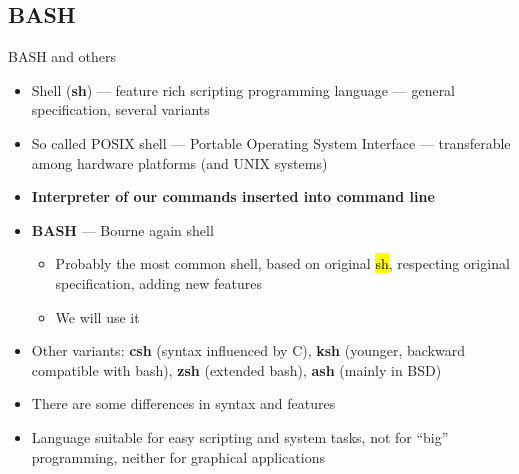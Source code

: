 \documentclass[compress, ucs, xelatex, 11pt, xcolor=svgnames, aspectratio=169,
	hyperref={
		bookmarks=true,
		unicode=true,
		colorlinks=true,
		pdftitle={Linux, command line and MetaCentrum},
		plainpages=false,
		pdfauthor={Vojtech Zeisek},
		pdfsubject={Course about use of Linux command line, writing shell scripts and using MetaCentrum of CESNET},
		pdfcreator={XeLaTeX},
		pdfkeywords={Linux, GNU, BASH, shell, command line, MetaCentrum},
		linkcolor=DarkRed, %
		anchorcolor=DarkBlue, %
		citecolor=Indigo, %
		filecolor=NavyBlue, %
		menucolor=DarkMagenta, %
		urlcolor=DarkBlue, %
		pdftex},
	url={hyphens, lowtilde} %
	]{beamer}
\renewcommand{\texttt}[1]{\hl{\ttfamily #1}}
\begin{document}
\subsection{BASH}

\begin{frame}{BASH and others}
	\begin{itemize}
		\item Shell (\textbf{sh}) --- feature rich scripting programming language --- general specification, several variants
		\item So called POSIX shell --- Portable Operating System Interface --- transferable among hardware platforms (and UNIX systems)
		\item \textbf{Interpreter of our commands inserted into command line}
		\item \textbf{BASH} --- Bourne again shell
		\begin{itemize}
			\item Probably the most common shell, based on original \texttt{sh}, respecting original specification, adding new features
			\item We will use it
		\end{itemize}
		\item Other variants: \textbf{csh} (syntax influenced by C), \textbf{ksh} (younger, backward compatible with bash), \textbf{zsh} (extended bash), \textbf{ash} (mainly in BSD)
		\item There are some differences in syntax and features
		\item Language suitable for easy scripting and system tasks, not for \enquote{big} programming, neither for graphical applications
	\end{itemize}
\end{frame}
\end{document}
